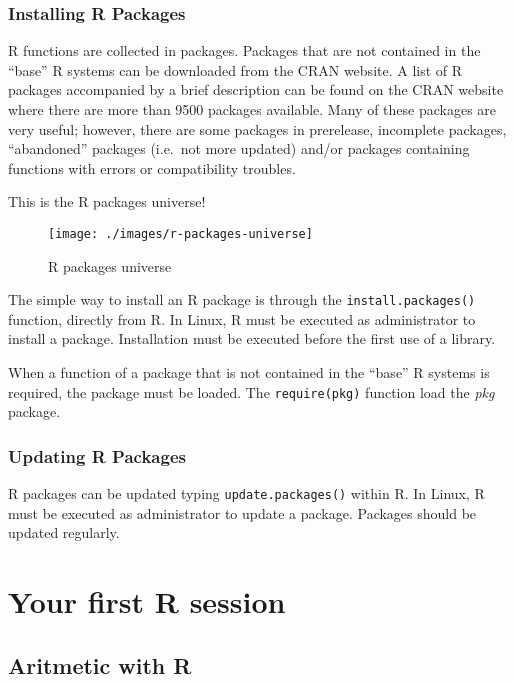 \documentclass[]{book}
\begin{document}
\subsection{Installing R Packages}\label{installing-r-packages}

R functions are collected in packages. Packages that are not contained
in the ``base'' R systems can be downloaded from the CRAN website. A
list of R packages accompanied by a brief description can be found on
the CRAN website where there are more than 9500 packages available. Many
of these packages are very useful; however, there are some packages in
prerelease, incomplete packages, ``abandoned'' packages (i.e.~not more
updated) and/or packages containing functions with errors or
compatibility troubles.

This is the R packages universe!

\begin{figure}[h]

{\centering \texttt{[image: ./images/r-packages-universe]} 

}

\caption{R packages universe}\label{fig:g5}
\end{figure}

The simple way to install an R package is through the
\texttt{install.packages()} function, directly from R. In Linux, R must
be executed as administrator to install a package. Installation must be
executed before the first use of a library.

When a function of a package that is not contained in the ``base'' R
systems is required, the package must be loaded. The
\texttt{require(pkg)} function load the \emph{pkg} package.

\subsection{Updating R Packages}\label{updating-r-packages}

R packages can be updated typing \texttt{update.packages()} within R. In
Linux, R must be executed as administrator to update a package. Packages
should be updated regularly.

\chapter{Your first R session}\label{your-first-r-session}

\section{Aritmetic with R}\label{aritmetic-with-r}
\end{document}
